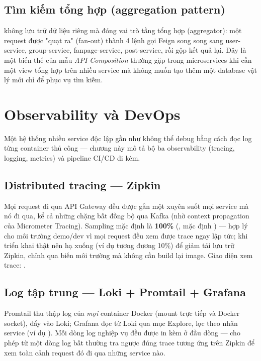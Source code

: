 \documentclass[12pt,a4paper]{report}
\begin{document}
\section{Tìm kiếm tổng hợp (aggregation pattern)}

 không lưu trữ dữ liệu riêng mà đóng vai trò tầng tổng
hợp (aggregator): một request  được "quạt ra" (fan-out)
thành 4 lệnh gọi Feign song song sang user-service, group-service,
fanpage-service, post-service, rồi gộp kết quả lại. Đây là một biến thể của
mẫu \emph{API Composition} thường gặp trong microservices khi cần một view
tổng hợp trên nhiều service mà không muốn tạo thêm một database vật lý mới
chỉ để phục vụ tìm kiếm.

\chapter{Observability và DevOps}
\label{ch:observability}

Một hệ thống nhiều service độc lập gần như không thể debug bằng cách đọc log
từng container thủ công — chương này mô tả bộ ba observability (tracing,
logging, metrics) và pipeline CI/CD đi kèm.

\section{Distributed tracing — Zipkin}

Mọi request đi qua API Gateway đều được gắn một  xuyên suốt mọi
service mà nó đi qua, kể cả những chặng bất đồng bộ qua Kafka (nhờ context
propagation của Micrometer Tracing). Sampling mặc định là \textbf{100\%}
(, mặc định ) — hợp lý cho môi
trường demo/dev vì mọi request đều xem được trace ngay lập tức; khi triển
khai thật nên hạ xuống (ví dụ  tương đương 10\%) để giảm tải lưu trữ
Zipkin, chỉnh qua biến môi trường mà không cần build lại image. Giao diện xem
trace: .

\section{Log tập trung — Loki + Promtail + Grafana}

Promtail thu thập log của \emph{mọi} container Docker (mount trực tiếp
 và Docker socket), đẩy vào Loki; Grafana
đọc từ Loki qua mục Explore, lọc theo nhãn service (ví dụ
). Mỗi dòng log nghiệp vụ đều được in kèm
 ở đầu dòng — cho phép từ một dòng log bất thường tra
ngược đúng trace tương ứng trên Zipkin để xem toàn cảnh request đó đi qua
những service nào.
\end{document}
